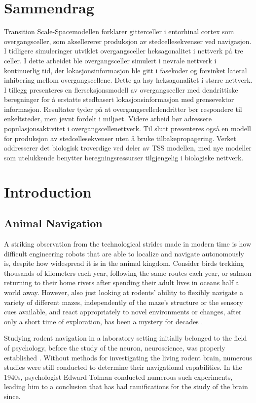 \documentclass{article}
\begin{document}
    \section*{Sammendrag}
    Transition Scale-Spacemodellen forklarer gitterceller i entorhinal cortex som overgangsceller, som aksellererer produksjon av stedcellesekvenser ved navigasjon. I tidligere simuleringer utviklet overgangsceller heksagonalitet i nettverk på tre celler. I dette arbeidet ble overgangsceller simulert i nevrale nettverk i kontinuerlig tid, der lokasjonsinformasjon ble gitt i fasekoder og forsinket lateral inhibering mellom overgangscellene. Dette ga høy heksagonalitet i større nettverk. I tillegg presenteres en flerseksjonsmodell av overgangsceller med dendrittiske beregninger for å erstatte stedbasert lokasjonsinformasjon med grensevektor informasjon. Resultater tyder på at overgangscelledendritter bør respondere til enkeltsteder, men jevnt fordelt i miljøet. Videre arbeid bør adressere populasjonsaktivitet i overgangscellenettverk. Til slutt presenteres også en modell for produksjon av stedcellesekvenser uten å bruke tilbakepropagering. Verket addresserer det biologisk troverdige ved deler av TSS modellen, med nye modeller som utelukkende benytter beregningsressurser tilgjengelig i biologiske nettverk.


    \newpage
    \section{Introduction}
    \subsection{Animal Navigation} \label{Animal Navigation}
    A striking observation from the technological strides made in modern time is how difficult engineering robots that are able to localize and navigate autonomously is, despite how widespread it is in the animal kingdom. Consider birds trekking thousands of kilometers each year, following the same routes each year, or salmon returning to their home rivers after spending their adult lives in oceans half a world away. However, also just looking at rodents' ability to flexibly navigate a variety of different mazes, independently of the maze's structure or the sensory cues available, and react appropriately to novel environments or changes, after only a short time of exploration, has been a mystery for decades \parencite{Wynn2023}.

    Studying rodent navigation in a laboratory setting initially belonged to the field of psychology, before the study of the neuron, neuroscience, was properly established \parencite{Dudchenko2010}. Without methods for investigating the living rodent brain, numerous studies were still conducted to determine their navigational capabilities. In the 1940s, psychologist Edward Tolman conducted numerous such experiments, leading him to a conclusion that has had ramifications for the study of the brain since.
    
\end{document}
